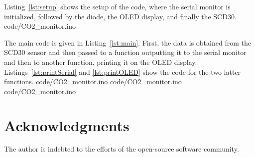 \documentclass[12pt,a4paper]{article}
\begin{document}
Listing~\ref{lst:setup} shows the setup of the code, where the serial monitor is initialized, followed by the diode, the OLED display, and finally the SCD30. 
%
{code/CO2_monitor.ino}

The main code is given in Listing~\ref{lst:main}. First, the data is obtained from the SCD30 sensor and then passed to a function outputting it to the serial monitor and then to another function, printing it on the OLED display. Listings~\ref{lst:printSerial} and \ref{lst:printOLED} show the code for the two latter functions.
%
{code/CO2_monitor.ino} 
%
{code/CO2_monitor.ino} 
%
{code/CO2_monitor.ino} 


\section*{Acknowledgments}
The author is indebted to the efforts of the open-source software community.



\end{document}
